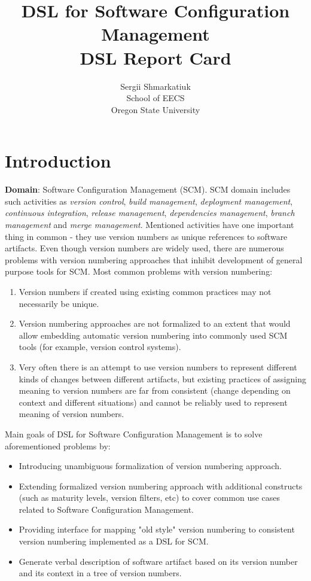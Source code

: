 \documentclass[11pt]{article}
\begin{document}
\title{\textbf{DSL for Software Configuration Management}
\\ DSL Report Card}

\author{Sergii Shmarkatiuk \\
School of EECS \\ 
Oregon State University
}

\maketitle


\section{Introduction}
\label{sec:intro}

\textbf{Domain}: Software Configuration Management (SCM). SCM domain includes such activities as \textit{version control}, \textit{build management}, \textit{deployment management}, \textit{continuous integration}, \textit{release management}, \textit{dependencies management}, \textit{branch management} and \textit{merge management}. Mentioned activities have one important thing in common - they use version numbers as unique references to software artifacts. Even though version numbers are widely used, there are numerous problems with version numbering approaches that inhibit development of general purpose tools for SCM. Most common problems with version numbering:
\begin{enumerate}
 \item Version numbers if created using existing common practices may not necessarily be unique. 
 \item Version numbering approaches are not formalized to an extent that would allow embedding automatic version numbering into commonly used SCM tools (for example, version control systems).
 \item Very often there is an attempt to use version numbers to represent different kinds of changes between different artifacts, but existing practices of assigning meaning to version numbers are far from consistent (change depending on context and different situations) and cannot be reliably used to represent meaning of version numbers.
\end{enumerate}

Main goals of DSL for Software Configuration Management is to solve aforementioned problems by:
\begin{itemize}
 \item Introducing unambiguous formalization of version numbering approach.
 \item Extending formalized version numbering approach with additional constructs (such as maturity levels, version filters, etc) to cover common use cases related to Software Configuration Management.
 \item Providing interface for mapping "old style" version numbering to consistent version numbering implemented as a DSL for SCM.
 \item Generate verbal description of software artifact based on its version number and its context in a tree of version numbers. 
 \end{itemize} 
\end{document}

